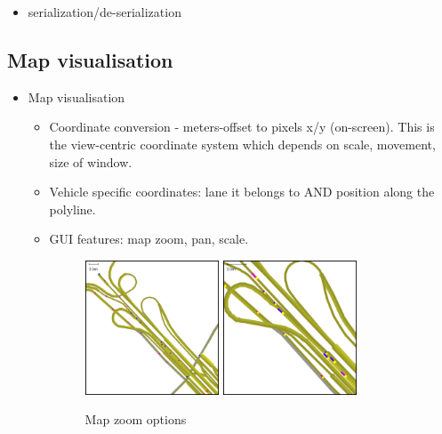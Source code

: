 \begin{itemize}
	\item serialization/de-serialization
\end{itemize}



\subsection{Map visualisation}
\begin{itemize}
    \item Map visualisation
    \begin{itemize}
        \item Coordinate conversion - meters-offset to pixels x/y (on-screen). This is the view-centric coordinate system which depends on scale, movement, size of window.
        \item Vehicle specific coordinates: lane it belongs to AND position along the polyline.
        \item GUI features: map zoom, pan, scale.
            \begin{figure}[h]
                \vspace{1.5em}
                \caption{Map zoom options}
                \label{fig:mapZoomOptions}
                \centering
                \includegraphics[width=0.4\textwidth]{figs/road/zoom_dots.png}
                \hspace{0.2em}
                \includegraphics[width=0.4\textwidth]{figs/road/zoom_cars.png}
            \end{figure}

    \end{itemize}
\end{itemize}


